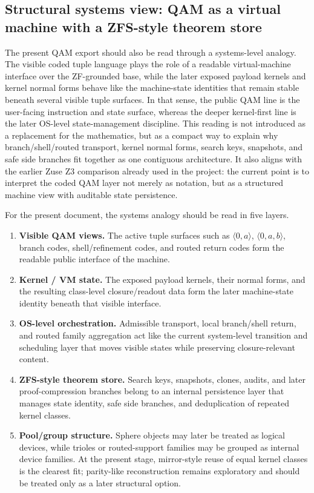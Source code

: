 \subsection*{Structural systems view: QAM as a virtual machine with a ZFS-style theorem store}
The present QAM export should also be read through a systems-level analogy. The visible coded tuple language plays the role of a readable virtual-machine interface over the ZF-grounded base, while the later exposed payload kernels and kernel normal forms behave like the machine-state identities that remain stable beneath several visible tuple surfaces. In that sense, the public QAM line is the user-facing instruction and state surface, whereas the deeper kernel-first line is the later OS-level state-management discipline. This reading is not introduced as a replacement for the mathematics, but as a compact way to explain why branch/shell/routed transport, kernel normal forms, search keys, snapshots, and safe side branches fit together as one contiguous architecture. It also aligns with the earlier Zuse Z3 comparison already used in the project: the current point is to interpret the coded QAM layer not merely as notation, but as a structured machine view with auditable state persistence.

\begin{remark}\label{rem:qam-vm-os-reading}
For the present document, the systems analogy should be read in five layers.
\begin{enumerate}[leftmargin=2em]
  \item \textbf{Visible QAM views.} The active tuple surfaces such as $\langle 0,a\rangle$, $\langle 0,a,b\rangle$, branch codes, shell/refinement codes, and routed return codes form the readable public interface of the machine.
  \item \textbf{Kernel / VM state.} The exposed payload kernels, their normal forms, and the resulting class-level closure/readout data form the later machine-state identity beneath that visible interface.
  \item \textbf{OS-level orchestration.} Admissible transport, local branch/shell return, and routed family aggregation act like the current system-level transition and scheduling layer that moves visible states while preserving closure-relevant content.
  \item \textbf{ZFS-style theorem store.} Search keys, snapshots, clones, audits, and later proof-compression branches belong to an internal persistence layer that manages state identity, safe side branches, and deduplication of repeated kernel classes.
  \item \textbf{Pool/group structure.} Sphere objects may later be treated as logical devices, while trioles or routed-support families may be grouped as internal device families. At the present stage, mirror-style reuse of equal kernel classes is the clearest fit; parity-like reconstruction remains exploratory and should be treated only as a later structural option.
\end{enumerate}
\end{remark}

